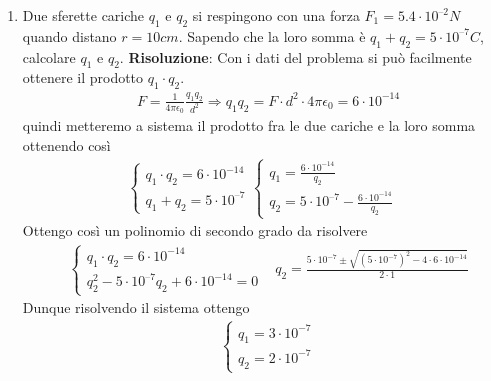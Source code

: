 \documentclass{book}
\begin{document}
\begin{enumerate}
    \item Due sferette cariche $q_1$ e $q_2$ si respingono con una forza $F_1 = 5.4 \cdot 10^{–2} N$ quando distano $r = 10 cm$. Sapendo che la loro somma è $q_1 + q_2 = 5 \cdot 10^{–7} C$, calcolare $q_1$ e $q_2$. 
    \newline
    \textbf{Risoluzione}: Con i dati del problema si può facilmente ottenere il prodotto $q_1 \cdot q_2$.
    \begin{align*}
        & F = \frac{1}{4 \pi \epsilon_0}\frac{q_{1}q_{2}}{d^2} \Rightarrow q_1q_2 = F \cdot d^2 \cdot 4 \pi \epsilon_0 = 6 \cdot 10^{-14} 
    \end{align*}
    quindi metteremo a sistema il prodotto fra le due cariche e la loro somma ottenendo così
    \begin{align*}
        \begin{cases}
            q_1 \cdot q_2 = 6 \cdot 10^{-14} \\
            q_1 + q_2 = 5 \cdot 10^{–7}
        \end{cases}
        \begin{cases}
            q_1 = \frac{6 \cdot 10^{-14} }{q_2} \\
            q_2 = 5 \cdot 10^{–7} - \frac{6 \cdot 10^{-14} }{q_2}
        \end{cases}
    \end{align*}
    Ottengo così un polinomio di secondo grado da risolvere
    \begin{align*}
        &\begin{cases}
            q_1 \cdot q_2 = 6 \cdot 10^{-14}  \\
            q_2^2 - 5 \cdot 10^{–7} q_2 + 6 \cdot 10^{-14} = 0
        \end{cases}
        & q_2 = \frac{5 \cdot 10^{-7} \pm \sqrt{(5 \cdot 10^{-7})^2 - 4 \cdot 6 \cdot 10^{-14} }}{2 \cdot 1}
    \end{align*}
    Dunque risolvendo il sistema ottengo
    \begin{align*}
        &\begin{cases}
            q_1 = 3 \cdot 10^{-7} \\
            q_2 = 2 \cdot 10^{-7}
        \end{cases}
    \end{align*}
    

\end{enumerate}
\end{document}
